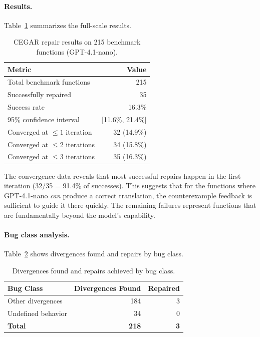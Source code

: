 \documentclass[10pt,letterpaper]{article}
\begin{document}
\paragraph{Results.}
Table~\ref{tab:cegar_full} summarizes the full-scale results.

\begin{table}[t]
\centering
\caption{CEGAR repair results on 215 benchmark functions (GPT-4.1-nano).}
\label{tab:cegar_full}
\begin{tabular}{@{}lr@{}}
\toprule
\textbf{Metric} & \textbf{Value} \\
\midrule
Total benchmark functions & 215 \\
Successfully repaired & 35 \\
Success rate & 16.3\% \\
95\% confidence interval & [11.6\%, 21.4\%] \\
\midrule
Converged at $\leq 1$ iteration & 32 (14.9\%) \\
Converged at $\leq 2$ iterations & 34 (15.8\%) \\
Converged at $\leq 3$ iterations & 35 (16.3\%) \\
\bottomrule
\end{tabular}
\end{table}

The convergence data reveals that most successful repairs happen in the first
iteration (32/35 = 91.4\% of successes). This suggests that for the functions
where GPT-4.1-nano \emph{can} produce a correct translation, the counterexample
feedback is sufficient to guide it there quickly. The remaining failures represent
functions that are fundamentally beyond the model's capability.

\paragraph{Bug class analysis.}
Table~\ref{tab:bugclass} shows divergences found and repairs by bug class.

\begin{table}[t]
\centering
\caption{Divergences found and repairs achieved by bug class.}
\label{tab:bugclass}
\begin{tabular}{@{}lrr@{}}
\toprule
\textbf{Bug Class} & \textbf{Divergences Found} & \textbf{Repaired} \\
\midrule
Other divergences & 184 & 3 \\
Undefined behavior & 34 & 0 \\
\midrule
\textbf{Total} & \textbf{218} & \textbf{3} \\
\bottomrule
\end{tabular}
\end{table}
\end{document}
